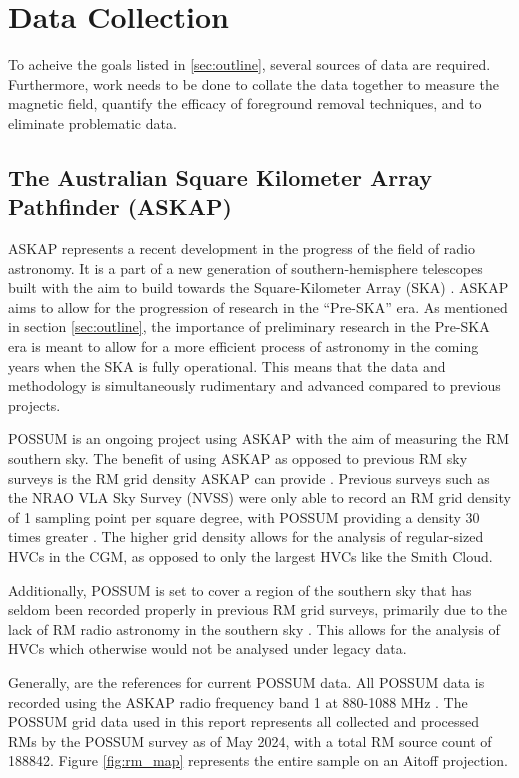 \chapter{Data Collection}
\label{cha:data}

To acheive the goals listed in \ref{sec:outline}, several sources of data are required. Furthermore, work needs to be done to collate the data together to measure the magnetic field, quantify the efficacy of foreground removal techniques, and to eliminate problematic data.

\section{The Australian Square Kilometer Array Pathfinder (ASKAP)}
\label{sec:ASKAP}

ASKAP represents a recent development in the progress of the field of radio astronomy. It is a part of a new generation of southern-hemisphere telescopes built with the aim to build towards the Square-Kilometer Array (SKA) \citep{ID61, ID52, ID71}. ASKAP aims to allow for the progression of research in the “Pre-SKA” era. As mentioned in section \ref{sec:outline}, the importance of preliminary research in the Pre-SKA era is meant to allow for a more efficient process of astronomy in the coming years when the SKA is fully operational. This means that the data and methodology is simultaneously rudimentary and advanced compared to previous projects.


POSSUM is an ongoing project using ASKAP with the aim of measuring the RM southern sky. The benefit of using ASKAP as opposed to previous RM sky surveys is the RM grid density ASKAP can provide \citep{ID52, ID71, ID61}. Previous surveys such as the NRAO VLA Sky Survey (NVSS) were only able to record an RM grid density of 1 sampling point per square degree, with POSSUM providing a density 30 times greater \citep{ID1, ID52, ID71, ID61, ID18}. The higher grid density allows for the analysis of regular-sized HVCs in the CGM, as opposed to only the largest HVCs like the Smith Cloud.


Additionally, POSSUM is set to cover a region of the southern sky that has seldom been recorded properly in previous RM grid surveys, primarily due to the lack of RM radio astronomy in the southern sky \citep{ID44, ID45, ID52, ID71}. This allows for the analysis of HVCs which otherwise would not be analysed under legacy data.


Generally, \cite{ID52, ID71} are the references for current POSSUM data. All POSSUM data is recorded using the ASKAP radio frequency band 1 at 880-1088 MHz \citep{ID1, ID52, ID71}. The POSSUM grid data used in this report represents all collected and processed RMs by the POSSUM survey as of May 2024, with a total RM source count of 188842. Figure \ref{fig:rm_map} represents the entire sample on an Aitoff projection.

